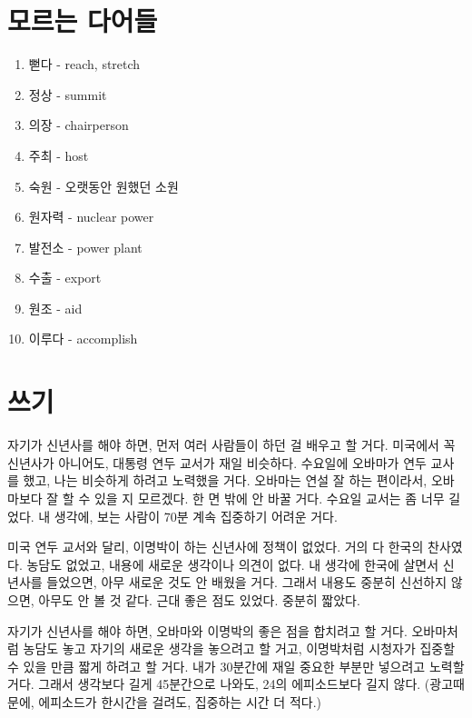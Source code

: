 \documentclass{article}
\begin{document}
\section{모르는 다어들}
\begin{enumerate}
  \item 뻗다 - reach, stretch
  \item 정상 - summit
  \item 의장 - chairperson
  \item 주최 - host
  \item 숙원 - 오랫동안 원했던 소원
  \item 원자력 - nuclear power
  \item 발전소 - power plant
  \item 수출 - export
  \item 원조 - aid
  \item 이루다 - accomplish
\end{enumerate}

\section{쓰기}
자기가 신년사를 해야 하면, 먼저 여러 사람들이 하던 걸 배우고 할 거다.  미국에서 꼭 신년사가 아니어도, 대통령 연두 교서가 재일 비슷하다.  수요일에 오바마가 연두 교사를 했고, 나는  비슷하게 하려고 노력했을 거다.  오바마는 연설 잘 하는 편이라서, 오바마보다 잘 할 수 있을 지 모르겠다.  한 면 밖에 안 바꿀 거다.  수요일 교서는 좀 너무 길었다. 내 생각에, 보는 사람이 70분 계속 집중하기 어려운 거다.

미국 연두 교서와 달리, 이명박이 하는 신년사에 정책이 없었다.  거의 다 한국의 찬사였다.  농담도 없었고, 내용에 새로운 생각이나 의견이 없다. 내 생각에 한국에 살면서 신년사를 들었으면, 아무 새로운 것도 안 배웠을 거다.  그래서 내용도 중분히 신선하지 않으면, 아무도 안 볼 것 같다.  근대 좋은 점도 있었다.  중분히 짧았다.  

자기가 신년사를 해야 하면, 오바마와 이명박의 좋은 점을 합치려고 할 거다.  오바마처럼 농담도 놓고 자기의 새로운 생각을 놓으려고 할 거고, 이명박처럼 시청자가 집중할 수 있을 만큼 짧게 하려고 할 거다. 내가 30분간에 재일 중요한 부분만 넣으려고 노력할 거다.  그래서 생각보다 길게 45분간으로 나와도, 24의 에피소드보다 길지 않다. (광고때문에, 에피소드가 한시간을 걸려도, 집중하는 시간 더 적다.)
\end{document}
